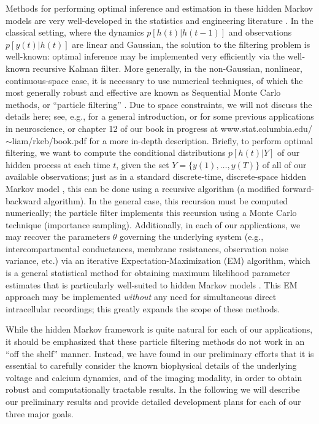 \documentclass[12pt]{article}
\begin{document}
Methods for performing optimal inference and estimation in these
hidden Markov models are very well-developed in the statistics and
engineering literature \cite{RAB89,DFG01}.  In the classical setting,
where the dynamics $p[h(t)|h(t-1)]$ and observations $p[y(t)|h(t)]$
are linear and Gaussian, the solution to the filtering problem is
well-known: optimal inference may be implemented very efficiently via
the well-known recursive Kalman filter.  More generally, in the
non-Gaussian, nonlinear, continuous-space case, it is necessary to use
numerical techniques, of which the most generally robust and effective
are known as Sequential Monte Carlo methods, or ``particle filtering''
\cite{DFG01}.  Due to space constraints, we will not discuss the
details here; see, e.g., \cite{DFG01} for a general introduction, or
\cite{Ergun07,HP06,Vogelstein07,PAN07} for some previous applications
in neuroscience, or chapter 12 of our book in progress at
www.stat.columbia.edu/$\sim$liam/rkeb/book.pdf for a more in-depth
description.  Briefly, to perform optimal filtering, we want to
compute the conditional distributions $p[h(t)|Y]$ of our hidden
process at each time $t$, given the set $Y=\{y(1),\ldots,y(T)\}$ of
all of our available observations; just as in a standard
discrete-time, discrete-space hidden Markov model \cite{RAB89}, this
can be done using a recursive algorithm (a modified forward-backward
algorithm).  In the general case, this recursion must be computed
numerically; the particle filter implements this recursion using a
Monte Carlo technique (importance sampling).  Additionally, in each of
our applications, we may recover the parameters $\theta$ governing the
underlying system (e.g., intercompartmental conductances, membrane
resistances, observation noise variance, etc.) via an iterative
Expectation-Maximization (EM) algorithm, which is a general
statistical method for obtaining maximum likelihood parameter
estimates that is particularly well-suited to hidden Markov models
\cite{RAB89,DFG01}.  This EM approach may be implemented
\emph{without} any need for simultaneous direct intracellular
recordings; this greatly expands the scope of these methods.

While the hidden Markov framework is quite natural for each of our
applications, it should be emphasized that these particle filtering
methods do not work in an ``off the shelf'' manner.  Instead, we have
found in our preliminary efforts
\cite{HP06,Vogelstein07,PAN07,PanFerr08,Vogelstein08} that it is
essential to carefully consider the known biophysical details of the
underlying voltage and calcium dynamics, and of the imaging modality,
in order to obtain robust and computationally tractable results.  In
the following we will describe our preliminary results and provide
detailed development plans for each of our three major goals.
\end{document}
